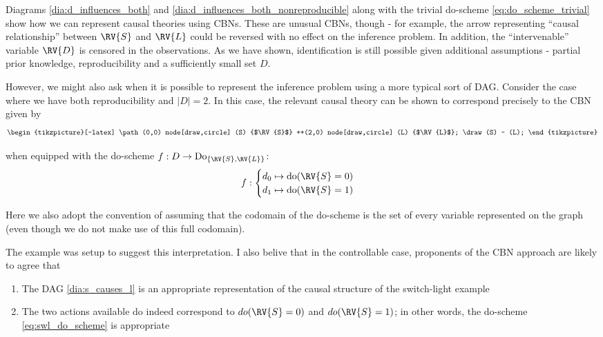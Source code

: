 Diagrams \ref{dia:d_influences_both} and \ref{dia:d_influences_both_nonreproducible} along with the trivial do-scheme \ref{eq:do_scheme_trivial} show how we can represent causal theories using CBNs. These are unusual CBNs, though - for example, the arrow representing ``causal relationship'' between $\RV{S}$ and $\RV{L}$ could be reversed with no effect on the inference problem. In addition, the ``intervenable'' variable $\RV{D}$ is censored in the observations. As we have shown, identification is still possible given additional assumptions - partial prior knowledge, reproducibility and a sufficiently small set $D$.

However, we might also ask when it is possible to represent the inference problem using a more typical sort of DAG. Consider the case where we have both reproducibility and $|D|=2$. In this case, the relevant causal theory can be shown to correspond precisely to the CBN given by
\begin{align}
\begin{tikzpicture}[-latex]
\path (0,0) node[draw,circle] (S) {$\RV{S}$}
++(2,0) node[draw,circle] (L) {$\RV{L}$};
\draw (S) -- (L);
\end{tikzpicture}\label{dia:s_causes_l}
\end{align}

when equipped with the do-scheme $f:D\to \mathrm{Do}_{\{\RV{S},\RV{L}\}}$:
\begin{align}
f : \begin{cases}
	d_0 \mapsto \mathrm{do}(\RV{S}=0)\\
	d_1\mapsto \mathrm{do}(\RV{S}=1)
\end{cases}\label{eq:swl_do_scheme}
\end{align}

Here we also adopt the convention of assuming that the codomain of the do-scheme is the set of every variable represented on the graph (even though we do not make use of this full codomain).

The example was setup to suggest this interpretation. I also belive that in the controllable case, proponents of the CBN approach are likely to agree that
\begin{enumerate}
 \item The DAG \ref{dia:s_causes_l} is an appropriate representation of the causal structure of the switch-light example
 \item The two actions available do indeed correspond to $do(\RV{S}=0)$ and $do(\RV{S}=1)$; in other words, the do-scheme \ref{eq:swl_do_scheme} is appropriate
\end{enumerate}

